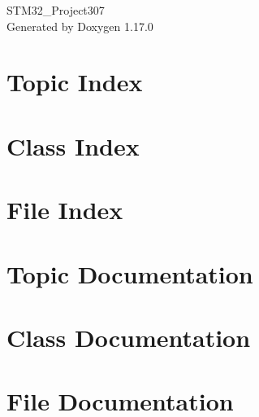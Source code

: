 \documentclass[twoside]{book}
\newcommand{\+}{\discretionary{\mbox{\scriptsize$\hookleftarrow$}}{}{}}
\newcommand{\clearemptydoublepage}{%
    \newpage{\pagestyle{empty}\cleardoublepage}%
  }
\begin{document}
  \raggedbottom
    \hypersetup{pageanchor=false,
                bookmarksnumbered=true,
                pdfencoding=unicode
               }
  \begin{titlepage}
  \vspace*{7cm}
  \begin{center}%
  {\Large STM32\+\_\+\+Project307}\\
  \vspace*{1cm}
  {\large Generated by Doxygen 1.17.0}\\
  \end{center}
  \end{titlepage}
  \clearemptydoublepage
  \tableofcontents
  \clearemptydoublepage
  \hypersetup{pageanchor=true}
\chapter{Topic Index}

\chapter{Class Index}

\chapter{File Index}

\chapter{Topic Documentation}



\chapter{Class Documentation}


\chapter{File Documentation}
























  \backmatter
  \newpage
  \clearemptydoublepage
  \printindex
\end{document}
